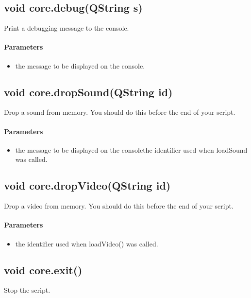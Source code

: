 \subsection{void core.debug(QString s)}
\label{sec:ScriptingAPI:core:debug}
Print a debugging message to the console.

\paragraph{Parameters}
\begin{itemize}
\item {} the message to be displayed on the console.
\end{itemize}

\subsection{void core.dropSound(QString id)}
\label{sec:ScriptingAPI:core:dropSound}
Drop a sound from memory. You should do this before the end of your script.

\paragraph{Parameters}
\begin{itemize}
\item {} the message to be displayed on the consolethe identifier used when loadSound was called.
\end{itemize}

\subsection{void core.dropVideo(QString id)}
\label{sec:ScriptingAPI:core:dropVideo}
Drop a video from memory. You should do this before the end of your script.

\paragraph{Parameters}
\begin{itemize}
\item {} the identifier used when loadVideo() was called.
\end{itemize}

\subsection{void core.exit()}
\label{sec:ScriptingAPI:core:exit}
Stop the script.

